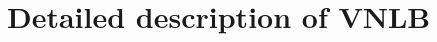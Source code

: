 \documentclass[mathserif, 8pt]{beamer}
\newcommand{\bsic}[1]{\textcolor{gray}{#1}}
\newcommand{\Bsic}[1]{\textcolor{gray}{\textbf{#1}}}
\newcommand{\Best}[1]{\textbf{\textcolor{MyOrangeBrighter}{#1}}}
\begin{document}




\section{Detailed description of VNLB}
\end{document}
